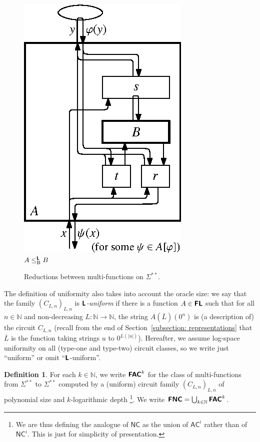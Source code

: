 \documentclass[conference]{IEEEtran}
\newcommand{\N}{\mathbb N}
\newcommand{\classonefont}[1]{\mathsf{#1}}
\newcommand{\classNC}{\classonefont{NC}}
\newcommand{\classAC}{\classonefont{AC}}
\newcommand{\classtwofont}[1]{\text{\bfseries \sffamily \upshape #1}}
\newcommand{\classLtwo}{\classtwofont{L}}
\newcommand{\classFLtwo}{\classtwofont{FL}}
\newcommand{\classFNCtwo}{\classtwofont{FNC}}
\newcommand{\classFACtwo}{\classtwofont{FAC}}
\newcommand{\redB}{\leq _{\mathrm B}}
\newcommand{\redLB}{\redB ^{\classLtwo}}
\newcommand{\LM}{\varSigma ^{**}}
\theoremstyle{definition}
\newtheorem{definition}[theorem]{Definition}
\theoremstyle{remark}
\begin{document}
\begin{figure}
\begin{center}
\hfill
\parbox[t]{150pt}{\centering\includegraphics[scale=0.9]{./redtwoBCEIP.eps}\\[3pt]$A \redLB B$}
\hfill\mbox{}
\caption{Reductions between multi-functions on $\LM$.}
\label{figure: intermediate many-one reduction}
\end{center}
\end{figure}

The definition of uniformity 
also takes into account the oracle size: 
we say that the family $(C_{L,n})_{L,n}$ is 
\emph{$\classLtwo$-uniform} if 
there is a function $A \in \classFLtwo$ such that 
for all $n \in \N$ and non-decreasing $L \colon \N \to \N$, 
the string $A (\overline L) (0^n)$ is (a description of) the circuit $C_{L,n}$ 
(recall from the end of Section~\ref{subsection: representations} 
that $\overline L$ is the function taking strings $u$ to $0 ^{L (\lvert u \rvert)}$). 
Hereafter, we assume log-space uniformity on all (type-one and type-two) 
circuit classes, so we write just ``uniform'' or omit ``$\classLtwo$-uniform''.

\begin{definition}
 For each $k \in \N$, 
 we write $\classFACtwo^k$ for the class of 
 multi-functions from $\LM$ to $\LM$ computed by
 a (uniform) circuit family $(C_{L,n})_{L,n}$ 
of polynomial size and $k$-logarithmic depth%
\footnote{We are thus defining the analogue of $\classNC$ as the union of 
$\classAC^i$ rather than of $\classNC^i$.  This is just for simplicity of presentation.}. 
 We write $\classFNCtwo = \bigcup_{k \in \N} \classFACtwo^k$.
\end{definition}
\end{document}
